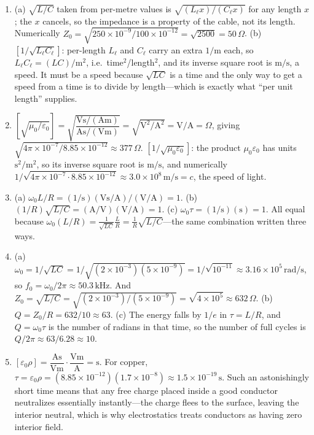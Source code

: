 \documentclass[11pt]{article}
\theoremstyle{mystyle}
\newcommand{\V}{\text{V}}
\newcommand{\A}{\text{A}}
\newcommand{\s}{\text{s}}
\newcommand{\m}{\text{m}}
\newcommand{\Ohm}{\Omega}
\begin{document}
\begin{enumerate}
\item
(a) $\sqrt{L/C}$ taken from per-metre values is $\sqrt{(L_\ell x)/(C_\ell x)}$ for any
length $x$; the $x$ cancels, so the impedance is a property of the cable, not its
length. Numerically $Z_0=\sqrt{250\times10^{-9}/100\times10^{-12}}
=\sqrt{2500}=50\,\Omega$.
(b) $[1/\sqrt{L_\ell C_\ell}]$: per-length $L_\ell$ and $C_\ell$ carry an extra
$1/\m$ each, so $L_\ell C_\ell=(LC)/\m^2$, i.e.\ time$^2$/length$^2$, and its inverse
square root is $\m/\s$, a speed. It must be a speed because $\sqrt{LC}$ is a time and
the only way to get a speed from a time is to divide by length---which is exactly what
``per unit length'' supplies.

\item $\left[\sqrt{\mu_0/\varepsilon_0}\right]=\sqrt{\dfrac{\V\s/(\A\m)}{\A\s/(\V\m)}}
=\sqrt{\V^2/\A^2}=\V/\A=\Ohm$, giving
$\sqrt{4\pi\times10^{-7}/8.85\times10^{-12}}\approx 377\,\Omega$.
$\left[1/\sqrt{\mu_0\varepsilon_0}\right]$: the product $\mu_0\varepsilon_0$ has units
$\s^2/\m^2$, so its inverse square root is $\m/\s$, and numerically
$1/\sqrt{4\pi\times10^{-7}\cdot8.85\times10^{-12}}\approx 3.0\times10^{8}\,\text{m/s}=c$,
the speed of light.

\item
(a) $\omega_0 L/R = (1/\s)(\V\s/\A)/(\V/\A) = 1$.
(b) $(1/R)\sqrt{L/C}=(\A/\V)(\V/\A)=1$.
(c) $\omega_0\tau=(1/\s)(\s)=1$. All equal because
$\omega_0(L/R)=\frac{1}{\sqrt{LC}}\frac{L}{R}=\frac{1}{R}\sqrt{L/C}$---the same
combination written three ways.

\item
(a) $\omega_0=1/\sqrt{LC}=1/\sqrt{(2\times10^{-3})(5\times10^{-9})}
=1/\sqrt{10^{-11}}\approx 3.16\times10^{5}\,\text{rad/s}$, so
$f_0=\omega_0/2\pi\approx 50.3\,\text{kHz}$. And
$Z_0=\sqrt{L/C}=\sqrt{(2\times10^{-3})/(5\times10^{-9})}=\sqrt{4\times10^{5}}
\approx 632\,\Omega$.
(b) $Q=Z_0/R=632/10\approx 63$.
(c) The energy falls by $1/e$ in $\tau=L/R$, and $Q=\omega_0\tau$ is the number of
radians in that time, so the number of full cycles is $Q/2\pi\approx 63/6.28\approx 10$.

\item $[\varepsilon_0\rho]=\dfrac{\A\s}{\V\m}\cdot\dfrac{\V\m}{\A}=\s$. For copper,
$\tau=\varepsilon_0\rho=(8.85\times10^{-12})(1.7\times10^{-8})\approx1.5\times10^{-19}\,\s$.
Such an astonishingly short time means that any free charge placed inside a good
conductor neutralizes essentially instantly---the charge flees to the surface, leaving
the interior neutral, which is why electrostatics treats conductors as having zero
interior field.


\end{enumerate}
\end{document}
